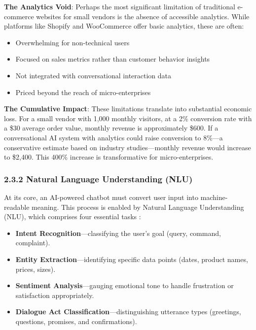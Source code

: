 \documentclass[12pt,a4paper]{article}
\begin{document}
\textbf{The Analytics Void}: Perhaps the most significant limitation of traditional e-commerce websites for small vendors is the absence of accessible analytics. While platforms like Shopify and WooCommerce offer basic analytics, these are often:

\begin{itemize}
    \item Overwhelming for non-technical users
    \item Focused on sales metrics rather than customer behavior insights
    \item Not integrated with conversational interaction data
    \item Priced beyond the reach of micro-enterprises
\end{itemize}

\textbf{The Cumulative Impact}: These limitations translate into substantial economic loss. For a small vendor with 1,000 monthly visitors, at a 2\% conversion rate with a \$30 average order value, monthly revenue is approximately \$600. If a conversational AI system with analytics could raise conversion to 8\%---a conservative estimate based on industry studies---monthly revenue would increase to \$2,400. This 400\% increase is transformative for micro-enterprises.

\subsubsection{2.3.2 Natural Language Understanding (NLU)}

At its core, an AI-powered chatbot must convert user input into machine-readable meaning. This process is enabled by Natural Language Understanding (NLU), which comprises four essential tasks \citep{jurafsky2023}:

\begin{itemize}
    \item \textbf{Intent Recognition}---classifying the user's goal (query, command, complaint).
    \item \textbf{Entity Extraction}---identifying specific data points (dates, product names, prices, sizes).
    \item \textbf{Sentiment Analysis}---gauging emotional tone to handle frustration or satisfaction appropriately.
    \item \textbf{Dialogue Act Classification}---distinguishing utterance types (greetings, questions, promises, and confirmations).
\end{itemize}
\end{document}
